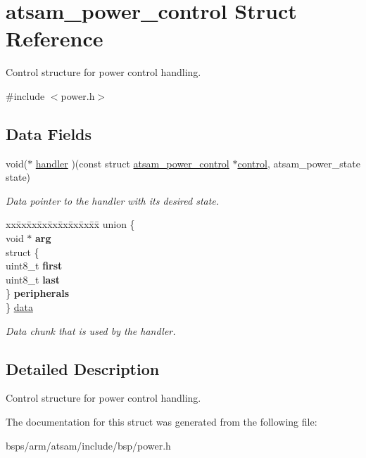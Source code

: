 \hypertarget{structatsam__power__control}{}\section{atsam\+\_\+power\+\_\+control Struct Reference}
\label{structatsam__power__control}


Control structure for power control handling.  




{\ttfamily \#include $<$power.\+h$>$}

\subsection*{Data Fields}
\begin{DoxyCompactItemize}
\item 
\mbox{\label{structatsam__power__control_a8973aa46cefb43699cc1c34d5390c756}} 
void($\ast$ \mbox{\hyperlink{structatsam__power__control_a8973aa46cefb43699cc1c34d5390c756}{handler}} )(const struct \mbox{\hyperlink{structatsam__power__control}{atsam\+\_\+power\+\_\+control}} $\ast$\mbox{\hyperlink{structcontrol}{control}}, atsam\+\_\+power\+\_\+state state)
\begin{DoxyCompactList}\small\item\em Data pointer to the handler with its desired state. \end{DoxyCompactList}\item 
\mbox{\label{structatsam__power__control_a8730f6c13f6b649ed001f43d01babbc8}} 
\begin{tabbing}
xx\=xx\=xx\=xx\=xx\=xx\=xx\=xx\=xx\=\kill
union \{\\
\>void $\ast$ {\bfseries arg}\\
\>struct \{\\
\>\>uint8\_t {\bfseries first}\\
\>\>uint8\_t {\bfseries last}\\
\>\} {\bfseries peripherals}\\
\} \mbox{\hyperlink{structatsam__power__control_a8730f6c13f6b649ed001f43d01babbc8}{data}}\\

\end{tabbing}\begin{DoxyCompactList}\small\item\em Data chunk that is used by the handler. \end{DoxyCompactList}\end{DoxyCompactItemize}


\subsection{Detailed Description}
Control structure for power control handling. 

The documentation for this struct was generated from the following file\+:\begin{DoxyCompactItemize}
\item 
bsps/arm/atsam/include/bsp/power.\+h\end{DoxyCompactItemize}
